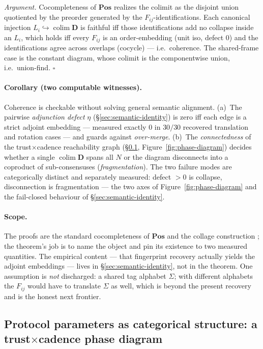 \documentclass{article}
\begin{document}
\emph{Argument.} Cocompleteness of $\mathbf{Pos}$ realizes the colimit as the
disjoint union quotiented by the preorder generated by the
$F_{ij}$-identifications. Each canonical injection
$L_i\hookrightarrow\operatorname{colim}\mathbf{D}$ is faithful iff those
identifications add no collapse inside an $L_i$, which holds iff every $F_{ij}$
is an order-embedding (unit iso, defect $0$) and the identifications agree
across overlaps (cocycle) --- i.e.\ coherence. The shared-frame case is the
constant diagram, whose colimit is the componentwise union, i.e.\ union-find.
\hfill$\square$

\paragraph{Corollary (two computable witnesses).} Coherence is checkable
without solving general semantic alignment. (a)~The pairwise \emph{adjunction
defect} $\eta$ (\S\ref{sec:semantic-identity}) is zero iff each edge is a strict
adjoint embedding --- measured exactly $0$ in $30/30$ recovered translation and
rotation cases --- and guards against \emph{over-merge}. (b)~The
\emph{connectedness} of the trust$\times$cadence reachability graph
(\S\ref{sec:phase-diagram}, Figure~\ref{fig:phase-diagram}) decides whether a
single $\operatorname{colim}\mathbf{D}$ spans all $N$ or the diagram
disconnects into a coproduct of sub-consensuses (\emph{fragmentation}). The two
failure modes are categorically distinct and separately measured: defect $>0$
is collapse, disconnection is fragmentation --- the two axes of
Figure~\ref{fig:phase-diagram} and the fail-closed behaviour of
\S\ref{sec:semantic-identity}.

\paragraph{Scope.} The proofs are the standard cocompleteness of $\mathbf{Pos}$
and the collage construction \citep{maclane1998categories}; the theorem's job
is to name the object and pin its existence to two measured quantities. The
empirical content --- that fingerprint recovery actually yields the adjoint
embeddings --- lives in \S\ref{sec:semantic-identity}, not in the theorem. One
assumption is \emph{not} discharged: a shared tag alphabet $\Sigma$; with
different alphabets the $F_{ij}$ would have to translate $\Sigma$ as well,
which is beyond the present recovery and is the honest next frontier.

\subsection{Protocol parameters as categorical structure: a trust\texorpdfstring{$\times$}{x}cadence phase diagram}
\label{sec:phase-diagram}
\end{document}
